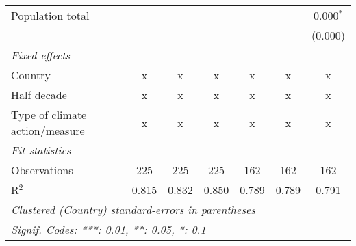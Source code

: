 \begin{tabular}{lcccccc}
   Population total                                              &         &                &                &                &                & 0.000$^{*}$\\   
                                                                 &         &                &                &                &                & (0.000)\\   
   \emph{Fixed effects}\\
   Country                                                       & x       & x              & x              & x              & x              & x\\  
   Half decade                                                   & x       & x              & x              & x              & x              & x\\  
   Type of climate action/measure                                & x       & x              & x              & x              & x              & x\\  
   \midrule \emph{Fit statistics}\\
   Observations                                                  & 225     & 225            & 225            & 162            & 162            & 162\\  
   R$^2$                                                         & 0.815   & 0.832          & 0.850          & 0.789          & 0.789          & 0.791\\  
   \midrule
   \multicolumn{7}{l}{\emph{Clustered (Country) standard-errors in parentheses}}\\
   \multicolumn{7}{l}{\emph{Signif. Codes: ***: 0.01, **: 0.05, *: 0.1}}\\
\end{tabular}
\par\endgroup


